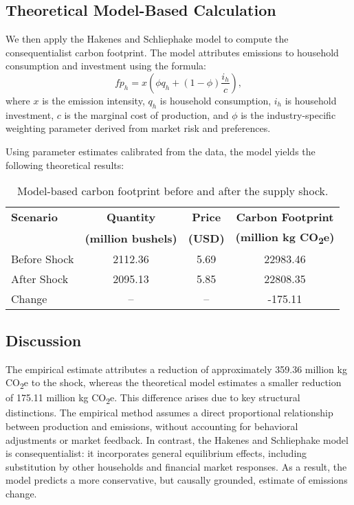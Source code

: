 \documentclass{article}
\begin{document}
\subsection*{Theoretical Model-Based Calculation}

We then apply the Hakenes and Schliephake model to compute the consequentialist carbon footprint. The model attributes emissions to household consumption and investment using the formula:
\[
fp_h = x \left( \phi q_h + (1 - \phi)\frac{i_h}{c} \right),
\]
where $x$ is the emission intensity, $q_h$ is household consumption, $i_h$ is household investment, $c$ is the marginal cost of production, and $\phi$ is the industry-specific weighting parameter derived from market risk and preferences.

Using parameter estimates calibrated from the data, the model yields the following theoretical results:


\begin{table}[ht]
\centering
\begin{tabular}{lccc}
\toprule
\textbf{Scenario} & \textbf{Quantity} & \textbf{Price} & \textbf{Carbon Footprint} \\
\textbf{} & \textbf{(million bushels)} & \textbf{(USD)} & \textbf{(million kg CO\textsubscript{2}e)} \\
\midrule
Before Shock  & 2112.36 & 5.69 & 22983.46 \\
After Shock   & 2095.13 & 5.85 & 22808.35 \\
\midrule
Change        & --      & --   & -175.11 \\
\bottomrule
\end{tabular}
\caption{Model-based carbon footprint before and after the supply shock.}
\end{table}

\subsection*{Discussion}

The empirical estimate attributes a reduction of approximately 359.36 million kg CO\textsubscript{2}e to the shock, whereas the theoretical model estimates a smaller reduction of 175.11 million kg CO\textsubscript{2}e. This difference arises due to key structural distinctions. The empirical method assumes a direct proportional relationship between production and emissions, without accounting for behavioral adjustments or market feedback. In contrast, the Hakenes and Schliephake model is consequentialist: it incorporates general equilibrium effects, including substitution by other households and financial market responses. As a result, the model predicts a more conservative, but causally grounded, estimate of emissions change.
\end{document}
